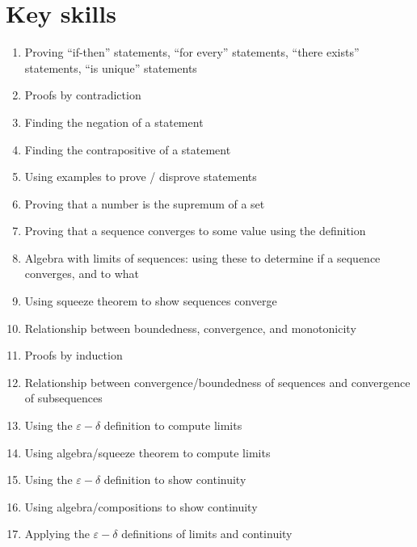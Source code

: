 \documentclass[12pt]{amsart}
\newcommand{\e}{\varepsilon}
\renewcommand{\d}{\delta}
\begin{document}
\section*{Key skills}

\begin{enumerate}
	\item Proving ``if-then'' statements, ``for every'' statements, ``there exists'' statements, ``is unique'' statements
	\item Proofs by contradiction
	\item Finding the negation of a statement
	\item Finding the contrapositive of a statement
	\item Using examples to prove / disprove statements

	\item Proving that a number is the supremum of a set

	\item Proving that a sequence converges to some value using the definition

		\item Algebra with limits of sequences: using these to determine if a sequence converges, and to what

	\item Using squeeze theorem to show sequences converge


	\item Relationship between boundedness, convergence, and monotonicity
					\item Proofs by induction
	

	\item Relationship between convergence/boundedness of sequences and convergence of subsequences


	\item Using the $\e-\d$ definition to compute limits
					
	\item Using algebra/squeeze theorem to compute limits
	
	\item Using the $\e-\d$ definition to show continuity

	\item Using algebra/compositions to show continuity
	\item Applying the $\e-\d$ definitions of limits and continuity
			\begin{comment}
			\item Applying the Intermediate Value Theorem
		\item Applying Boundedness and Extreme Value Theorems
		


\end{comment}
\end{enumerate}
\end{document}
